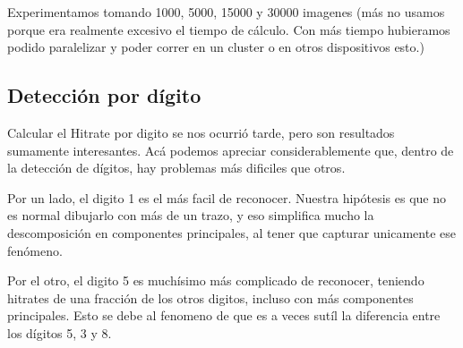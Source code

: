 Experimentamos tomando 1000, 5000, 15000 y 30000 imagenes (m\'as no usamos porque era
realmente excesivo el tiempo de c\'alculo. Con m\'as tiempo hubieramos podido paralelizar
y poder correr en un cluster o en otros dispositivos esto.)



\subsection{Detecci\'on por d\'igito}
Calcular el Hitrate por digito se nos ocurri\'o tarde, pero son resultados
sumamente interesantes. Ac\'a podemos apreciar considerablemente que, dentro de
la detecci\'on de d\'igitos, hay problemas m\'as dificiles que otros.

Por un lado, el digito 1 es el m\'as facil de reconocer. Nuestra hip\'otesis
es que no es normal dibujarlo con m\'as de un trazo, y eso simplifica mucho la
descomposici\'on en componentes principales, al tener que capturar unicamente ese
fen\'omeno.

Por el otro, el digito 5 es much\'isimo m\'as complicado de reconocer, teniendo
hitrates de una fracci\'on de los otros digitos, incluso con m\'as componentes
principales. Esto se debe al fenomeno de que es a veces sut\'il la diferencia
entre los d\'igitos 5, 3 y 8.


